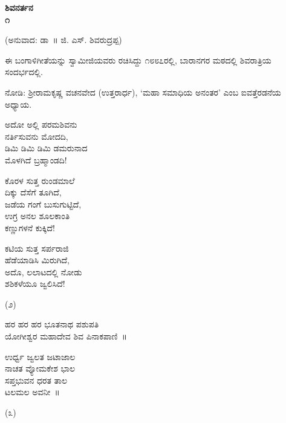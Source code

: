 \begin{center}
\textbf{ಶಿವನರ್ತನ\\೧}
\end{center}

\begin{center}
(ಅನುವಾದ: ಡಾ~॥ ಜಿ. ಎಸ್. ಶಿವರುದ್ರಪ್ಪ)
\end{center}

ಈ ಬಂಗಾಳಿಗೀತೆಯನ್ನು ಸ್ವಾಮೀಜಿಯವರು ರಚಿಸಿದ್ದು ೧೮೮೭ರಲ್ಲಿ, ಬಾರಾನಗರ ಮಠದಲ್ಲಿ ಶಿವರಾತ್ರಿಯ ಸಂದರ್ಭದಲ್ಲಿ.

ನೋಡಿ: ಶ‍್ರೀರಾಮಕೃಷ್ಣ ವಚನವೇದ (ಉತ್ತರಾರ್ಧ), ‘ಮಹಾ ಸಮಾಧಿಯ ಅನಂತರ’ ಎಂಬ ಐವತ್ತೆರಡನೆಯ ಅಧ್ಯಾಯ.

\begin{myquote}
ಅದೋ ಅಲ್ಲಿ ಪರಮಶಿವನು\\ನರ್ತಿಸುವನು ಮೋದದಿ,\\ಡಿಮಿ ಡಿಮಿ ಡಿಮಿ ಡಮರುನಾದ\\ಮೊಳಗಿದೆ ಬ್ರಹ್ಮಾಂಡದಿ!
\end{myquote}

\begin{myquote}
ಕೊರಳ ಸುತ್ತ ರುಂಡಮಾಲೆ\\ದಿಕ್ಕು ದೆಸೆಗೆ ತೂಗಿದೆ,\\ಜಡೆಯ ಗಂಗೆ ಬುಸುಗುಟ್ಟಿದೆ,\\ಉಗ್ರ ಅನಲ ಶೂಲಕಾಂತಿ\\ಕಣ್ಣುಗಳನೆ ಕುಕ್ಕಿದೆ!
\end{myquote}

\begin{myquote}
ಕಟಿಯ ಸುತ್ತ ಸರ್ಪರಾಜಿ\\ಹೆಡೆಯಾಡಿಸಿ ಮಿರುಗಿದೆ,\\ಅದೊ, ಲಲಾಟದಲ್ಲಿ ನೋಡು\\ಶಶಿಕಳೆಯೂ ಜ್ವಲಿಸಿದೆ!
\end{myquote}

\begin{center}
(೨)
\end{center}

\begin{myquote}
ಹರ ಹರ ಹರ ಭೂತನಾಥ ಪಶುಪತಿ\\ಯೋಗೀಶ್ವರ ಮಹಾದೇವ ಶಿವ ಪಿನಾಕಪಾಣಿ~॥
\end{myquote}

\begin{myquote}
ಉರ್ಧ್ವ ಜ್ವಲತ ಜಟಾಜಾಲ\\ನಾಚತ ವ್ಯೋಮಕೇಶ ಭಾಲ\\ಸಪ್ತಭುವನ ಧರತ ತಾಲ\\ಟಲಮಲ ಅವನೀ~॥
\end{myquote}

\begin{center}
(೩)
\end{center}

